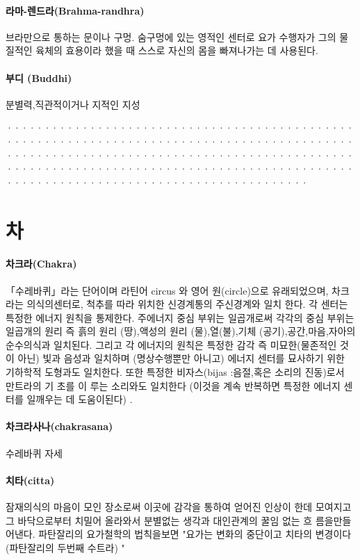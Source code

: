 \documentclass[12pt, a4paper, oneside]{book}
\let\stdsection\section
\renewcommand\section{\newpage\stdsection}
\begin{document}
\paragraph{라마-렌드라(Brahma-randhra)}
브라만으로 통하는 문이나 구멍. 숨구멍에 있는 영적인 센터로 요가 수행자가 그의 물질적인 육체의 효용이라 했을 때 스스로 자신의 몸을 빠져나가는 데 사용된다.

\paragraph{부디 (Buddhi)}
분별력,직관적이거나 지적인 지성

································································································································································································································

\newpage
\section{차}

\paragraph{차크라(Chakra)}
「수레바퀴」라는 단어이며 라틴어 circus 와 영어 원(circle)으로 유래되었으며, 차크라는 의식의센터로, 척추를 따라 위치한 신경계통의 주신경계와 일치 한다. 각 센터는 특정한 에너지 원칙을 통제한다. 주에너지 중심 부위는 일곱개로써 각각의 중심 부위는 일곱개의 원리 즉 흙의 원리 (땅),액성의 원리 (물),열(불),기체 (공기),공간,마음,자아의 순수의식과 일치된다. 그리고 각 에너지의 원칙은 특정한 감각 즉 미묘한(물존적인 것이  아닌) 빛과 음성과 일치하며 (명상수행뿐만 아니고) 에너지 센터를 묘사하기 위한 기하학적 도형과도 일치한다. 또한 특정한 비자스(bijas :음절,혹은 소리의 진동)로서 만트라의 기 초를 이 루는 소리와도 일치한다 (이것을 계속 반복하면 특정한 에너지 센터를 일깨우는 데 도움이된다) .

\paragraph{차크라사나(chakrasana)}
수레바퀴 자세

\paragraph{치타(citta)}
잠재의식의 마음이 모인 장소로써 이곳에 감각을 통하여 얻어진 인상이 한데 모여지고 그 바닥으로부터 치밀어 올라와서 분별없는 생각과 대인관계의 꿀임 없는 흐 름을만들어낸다. 파탄잘리의 요가철학의 법칙을보면 "요가는 변화의 중단이고 치타의 변경이다(파탄잘리의 두번째 수트라) "
\end{document}
